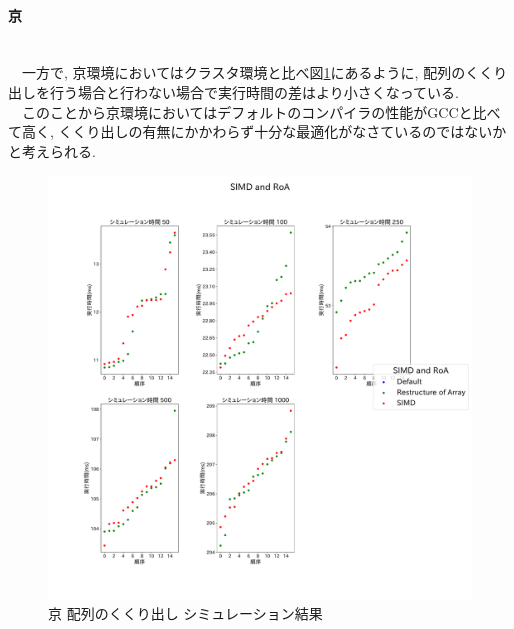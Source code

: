 \paragraph{京}~\\
　一方で, 京環境においてはクラスタ環境と比べ図\ref{fig:k-roa}にあるように,
配列のくくり出しを行う場合と行わない場合で実行時間の差はより小さくなっている.\\
　このことから京環境においてはデフォルトのコンパイラの性能がGCCと比べて高く,
くくり出しの有無にかかわらず十分な最適化がなさているのではないかと考えられる.\\
\begin{figure}[htb]
\begin{center}
    \includegraphics[width=14cm]{./images/k-SIMD-and-RoA.pdf}
    \caption{京 配列のくくり出し シミュレーション結果}
    \label{fig:k-roa}
\end{center}
\end{figure}
\clearpage

